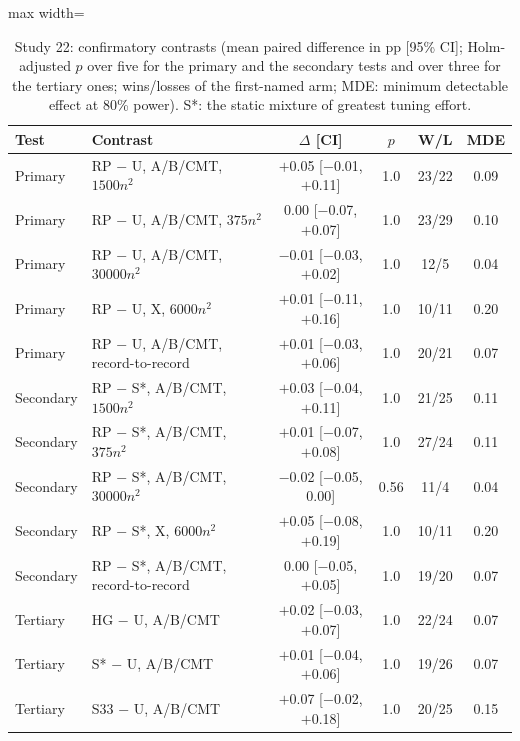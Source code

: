 \begin{table}[t]
\caption{Study 22: confirmatory contrasts (mean paired difference in pp [95\% CI]; Holm-adjusted $p$ over five for the primary and the secondary tests and over three for the tertiary ones; wins/losses of the first-named arm; MDE: minimum detectable effect at 80\% power). S*: the static mixture of greatest tuning effort.}\label{tab:s22f}
\centering
\small
\begin{adjustbox}{max width=\linewidth}
\begin{tabular}{llcccc}
\toprule
Test & Contrast & $\Delta$ [CI] & $p$ & W/L & MDE \\
\midrule
Primary & RP $-$ U, A/B/CMT, $1500n^2$ & $+$0.05 [$-$0.01, $+$0.11] & 1.0 & 23/22 & 0.09 \\
Primary & RP $-$ U, A/B/CMT, $375n^2$ & 0.00 [$-$0.07, $+$0.07] & 1.0 & 23/29 & 0.10 \\
Primary & RP $-$ U, A/B/CMT, $30000n^2$ & $-$0.01 [$-$0.03, $+$0.02] & 1.0 & 12/5 & 0.04 \\
Primary & RP $-$ U, X, $6000n^2$ & $+$0.01 [$-$0.11, $+$0.16] & 1.0 & 10/11 & 0.20 \\
Primary & RP $-$ U, A/B/CMT, record-to-record & $+$0.01 [$-$0.03, $+$0.06] & 1.0 & 20/21 & 0.07 \\
Secondary & RP $-$ S*, A/B/CMT, $1500n^2$ & $+$0.03 [$-$0.04, $+$0.11] & 1.0 & 21/25 & 0.11 \\
Secondary & RP $-$ S*, A/B/CMT, $375n^2$ & $+$0.01 [$-$0.07, $+$0.08] & 1.0 & 27/24 & 0.11 \\
Secondary & RP $-$ S*, A/B/CMT, $30000n^2$ & $-$0.02 [$-$0.05, 0.00] & 0.56 & 11/4 & 0.04 \\
Secondary & RP $-$ S*, X, $6000n^2$ & $+$0.05 [$-$0.08, $+$0.19] & 1.0 & 10/11 & 0.20 \\
Secondary & RP $-$ S*, A/B/CMT, record-to-record & 0.00 [$-$0.05, $+$0.05] & 1.0 & 19/20 & 0.07 \\
Tertiary & HG $-$ U, A/B/CMT & $+$0.02 [$-$0.03, $+$0.07] & 1.0 & 22/24 & 0.07 \\
Tertiary & S* $-$ U, A/B/CMT & $+$0.01 [$-$0.04, $+$0.06] & 1.0 & 19/26 & 0.07 \\
Tertiary & S33 $-$ U, A/B/CMT & $+$0.07 [$-$0.02, $+$0.18] & 1.0 & 20/25 & 0.15 \\
\bottomrule
\end{tabular}
\end{adjustbox}
\end{table}
